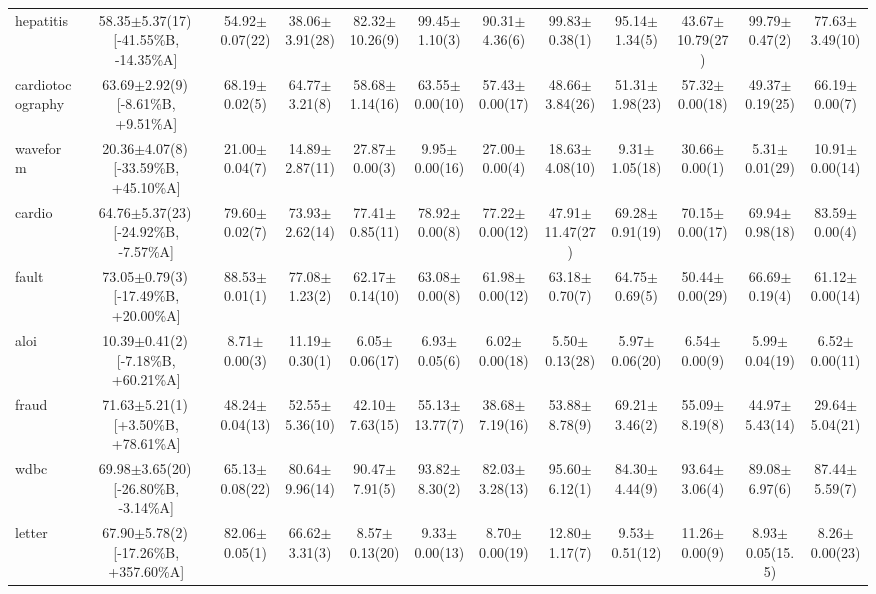 \documentclass[conference]{IEEEtran}
\begin{document}
\begin{table}
{\begin{tabular}{lccccccccccc}
				hepatitis & 58.35$\pm$5.37(17)\,[{-}41.55\%B, {-}14.35\%A] & 54.92$\pm$0.07(22) & 38.06$\pm$3.91(28) & 82.32$\pm$10.26(9) & 99.45$\pm$1.10(3) & 90.31$\pm$4.36(6) & 99.83$\pm$0.38(1) & 95.14$\pm$1.34(5) & 43.67$\pm$10.79(27) & 99.79$\pm$0.47(2) & 77.63$\pm$3.49(10) \\
				cardiotocography & 63.69$\pm$2.92(9)\,[{-}8.61\%B, {+}9.51\%A] & 68.19$\pm$0.02(5) & 64.77$\pm$3.21(8) & 58.68$\pm$1.14(16) & 63.55$\pm$0.00(10) & 57.43$\pm$0.00(17) & 48.66$\pm$3.84(26) & 51.31$\pm$1.98(23) & 57.32$\pm$0.00(18) & 49.37$\pm$0.19(25) & 66.19$\pm$0.00(7) \\
				waveform & 20.36$\pm$4.07(8)\,[{-}33.59\%B, {+}45.10\%A] & 21.00$\pm$0.04(7) & 14.89$\pm$2.87(11) & 27.87$\pm$0.00(3) & 9.95$\pm$0.00(16) & 27.00$\pm$0.00(4) & 18.63$\pm$4.08(10) & 9.31$\pm$1.05(18) & 30.66$\pm$0.00(1) & 5.31$\pm$0.01(29) & 10.91$\pm$0.00(14) \\
				cardio & 64.76$\pm$5.37(23)\,[{-}24.92\%B, {-}7.57\%A] & 79.60$\pm$0.02(7) & 73.93$\pm$2.62(14) & 77.41$\pm$0.85(11) & 78.92$\pm$0.00(8) & 77.22$\pm$0.00(12) & 47.91$\pm$11.47(27) & 69.28$\pm$0.91(19) & 70.15$\pm$0.00(17) & 69.94$\pm$0.98(18) & 83.59$\pm$0.00(4) \\
				fault & 73.05$\pm$0.79(3)\,[{-}17.49\%B, {+}20.00\%A] & 88.53$\pm$0.01(1) & 77.08$\pm$1.23(2) & 62.17$\pm$0.14(10) & 63.08$\pm$0.00(8) & 61.98$\pm$0.00(12) & 63.18$\pm$0.70(7) & 64.75$\pm$0.69(5) & 50.44$\pm$0.00(29) & 66.69$\pm$0.19(4) & 61.12$\pm$0.00(14) \\
				aloi & 10.39$\pm$0.41(2)\,[{-}7.18\%B, {+}60.21\%A] & 8.71$\pm$0.00(3) & 11.19$\pm$0.30(1) & 6.05$\pm$0.06(17) & 6.93$\pm$0.05(6) & 6.02$\pm$0.00(18) & 5.50$\pm$0.13(28) & 5.97$\pm$0.06(20) & 6.54$\pm$0.00(9) & 5.99$\pm$0.04(19) & 6.52$\pm$0.00(11) \\
				fraud & 71.63$\pm$5.21(1)\,[{+}3.50\%B, {+}78.61\%A] & 48.24$\pm$0.04(13) & 52.55$\pm$5.36(10) & 42.10$\pm$7.63(15) & 55.13$\pm$13.77(7) & 38.68$\pm$7.19(16) & 53.88$\pm$8.78(9) & 69.21$\pm$3.46(2) & 55.09$\pm$8.19(8) & 44.97$\pm$5.43(14) & 29.64$\pm$5.04(21) \\
				wdbc & 69.98$\pm$3.65(20)\,[{-}26.80\%B, {-}3.14\%A] & 65.13$\pm$0.08(22) & 80.64$\pm$9.96(14) & 90.47$\pm$7.91(5) & 93.82$\pm$8.30(2) & 82.03$\pm$3.28(13) & 95.60$\pm$6.12(1) & 84.30$\pm$4.44(9) & 93.64$\pm$3.06(4) & 89.08$\pm$6.97(6) & 87.44$\pm$5.59(7) \\
				letter & 67.90$\pm$5.78(2)\,[{-}17.26\%B, {+}357.60\%A] & 82.06$\pm$0.05(1) & 66.62$\pm$3.31(3) & 8.57$\pm$0.13(20) & 9.33$\pm$0.00(13) & 8.70$\pm$0.00(19) & 12.80$\pm$1.17(7) & 9.53$\pm$0.51(12) & 11.26$\pm$0.00(9) & 8.93$\pm$0.05(15.5) & 8.26$\pm$0.00(23) \\

\end{tabular}}
\end{table}
\end{document}
